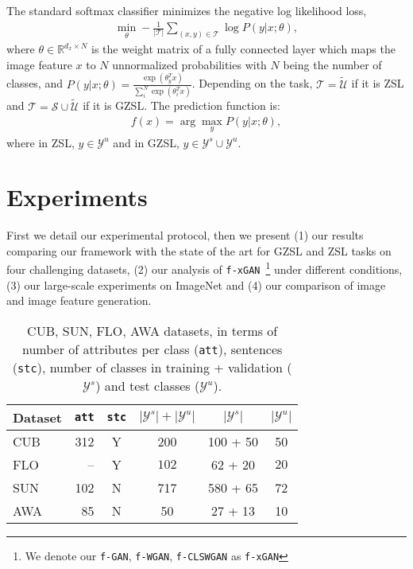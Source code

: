 \documentclass[10pt,twocolumn,letterpaper]{article}
\newcommand{\myparagraph}[1]{\vspace{6pt}\noindent{\bf #1}}
\def\mthd{\texttt{f-xGAN}\xspace}
\begin{document}
\myparagraph{\texttt{Softmax.}} The standard softmax classifier minimizes the negative log likelihood loss,
\begin{align}
\min_\theta  - \frac{1}{|\mathcal{T}|}\sum_{(x,y)\in \mathcal{T}} \log P(y| x; \theta), 
\end{align}
where $\theta\in \mathbb{R}^{d_x \times N}$ is the weight matrix of a fully connected layer which maps the image feature $x$ to $N$ unnormalized probabilities with $N$ being the number of classes, and $P(y| x;\theta) = \frac{\exp(\theta_y^T x)}{\sum_i^N \exp(\theta_i^T x)}$. Depending on the task, $\mathcal{T}=\tilde{\mathcal{U}}$ if it is ZSL and $\mathcal{T}=\mathcal{S} \cup \tilde{\mathcal{U}}$ if it is GZSL. The prediction function is:
\begin{align}
f(x) = \arg\max_{y} P(y| x; \theta),
\end{align}
where in ZSL, $y\in \mathcal{Y}^{u}$ and in GZSL, $y\in \mathcal{Y}^{s} \cup \mathcal{Y}^{u}$.



\section{Experiments}

First we detail our experimental protocol, then we present (1) our results comparing our framework with the state of the art for GZSL and ZSL tasks on four challenging datasets, (2) our analysis of \mthd~\footnote{We denote our \texttt{f-GAN}, \texttt{f-WGAN}, \texttt{f-CLSWGAN} as \texttt{f-xGAN}} under different conditions, (3) our large-scale experiments on ImageNet and (4) our comparison of image and image feature generation.

{
\setlength{\tabcolsep}{4.5pt}
\renewcommand{\arraystretch}{1.2}
\begin{table}[t]
\vspace{-3mm}
 \begin{center}
  \begin{tabular}{ l r c c c c }
\textbf{Dataset}  & \texttt{att} & \texttt{stc} & $|\mathcal{Y}^{s}|+|\mathcal{Y}^{u}|$ & $|\mathcal{Y}^{s}|$ & $|\mathcal{Y}^{u}|$  \\     \hline
    CUB~\cite{CaltechUCSDBirdsDataset}  & 312 & Y & 200 & 100 + 50 & 50 \\
    FLO~\cite{OxfordFlowersDataset} & -- & Y & $102$ & 62 + 20 & $20$  \\
    SUN~\cite{PH12}  & 102 & N & 717 & 580 + 65 & 72 \\  
    AWA~\cite{LNH13}  & 85 & N & 50 & 27 + 13 & 10
  \end{tabular}
 \end{center}
 \vspace{-4mm}
\caption{CUB, SUN, FLO, AWA datasets, in terms of number of attributes per class (\texttt{att}), sentences (\texttt{stc}), number of classes in training + validation ($\mathcal{Y}^{s}$) and test classes ($\mathcal{Y}^{u}$).}
\label{tab:datasets}
\end{table}
}
\end{document}
